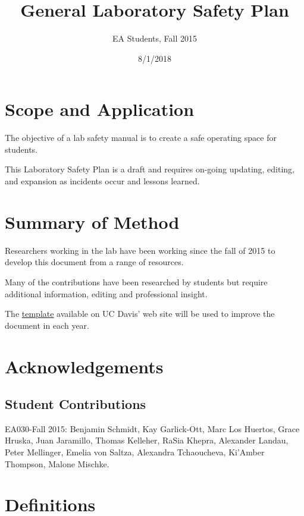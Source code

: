 \documentclass[12pt]{../../cls/SOP4_alpha}\usepackage[]{graphicx}\usepackage[]{xcolor}
\title{General Laboratory Safety Plan}
\date{8/1/2018}
\author{EA Students, Fall 2015}
\begin{document}
\maketitle


\section{Scope and Application}

\NP The objective of a lab safety manual is to create a safe operating space for students.

\NP This Laboratory Safety Plan is a draft and requires on-going updating, editing, and expansion as incidents occur and lessons learned. 


\section{Summary of Method}

\NP Researchers working in the lab have been working since the fall of 2015 to develop this document from a range of resources. 

\NP Many of the contributions have been researched by students but require additional information, editing and professional insight.

\NP The \href{http://safetyservices.ucdavis.edu/sites/default/files/documents/LabSafetyPlan_Template.docx}{template} available on UC Davis' web site will be used to improve the document in each year.

\newpage
\tableofcontents

\section{Acknowledgements}

\subsection*{Student Contributions}

\NP EA030-Fall 2015: Benjamin Schmidt, Kay Garlick-Ott, Marc Los Huertos, Grace Hruska, Juan Jaramillo, Thomas Kelleher, RaSia Khepra, Alexander Landau, Peter Mellinger, Emelia von Saltza, Alexandra Tchaoucheva, Ki'Amber Thompson, Malone Mischke.


\section{Definitions}
\end{document}
